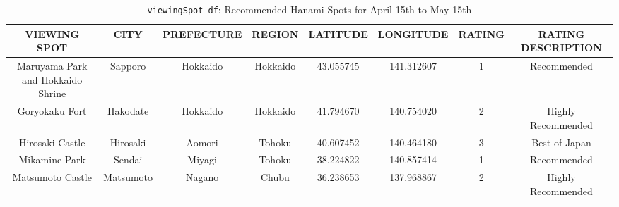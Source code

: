 \begin{table}[H]
  \tiny
  \centering
  \caption{\texttt{viewingSpot\_df}: Recommended Hanami Spots for April 15th to May 15th}
  \begin{tabular}{cccccccc}
  \toprule
  VIEWING SPOT                     & CITY      & PREFECTURE & REGION   &  LATITUDE &  LONGITUDE    & RATING & RATING DESCRIPTION \\
  \midrule
  Maruyama Park and Hokkaido Shrine &   Sapporo & Hokkaido   & Hokkaido & 43.055745 & 141.312607  & 1      &        Recommended \\
                     Goryokaku Fort &  Hakodate & Hokkaido   & Hokkaido & 41.794670 & 140.754020  & 2      & Highly Recommended \\
                    Hirosaki Castle &  Hirosaki &   Aomori   &   Tohoku & 40.607452 & 140.464180  & 3      &      Best of Japan \\
                      Mikamine Park &    Sendai &   Miyagi   &   Tohoku & 38.224822 & 140.857414  & 1      &        Recommended \\
                   Matsumoto Castle & Matsumoto &   Nagano   &    Chubu & 36.238653 & 137.968867  & 2      & Highly Recommended \\
  \bottomrule
  \end{tabular}
  \end{table}